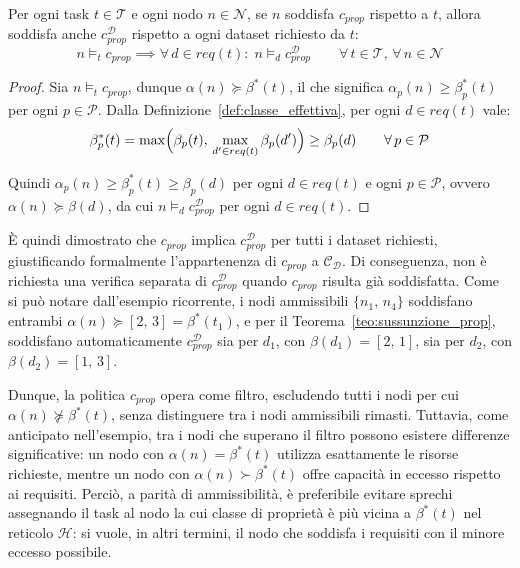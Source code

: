 \begin{theorem}
    \label{teo:sussunzione_prop}
    Per ogni task $t \in \mathcal{T}$ e ogni nodo $n \in \mathcal{N}$, se $n$ soddisfa $c_{prop}$ rispetto a $t$, allora soddisfa anche $c_{prop}^{\mathcal{D}}$ rispetto a ogni dataset richiesto da $t$:
    \begin{equation}
        n \models_t c_{prop}
        \implies
        \forall\, d \in req(t) :\; n \models_d c_{prop}^{\mathcal{D}}
        \qquad
        \forall\, t \in \mathcal{T},\, \forall\, n \in \mathcal{N}
    \end{equation}
    \begin{proof}
        Sia $n \models_t c_{prop}$, dunque $\alpha(n) \succeq \beta^*(t)$, il che significa $\alpha_p(n) \geq \beta^*_p(t)$ per ogni $p \in \mathcal{P}$. Dalla Definizione~\ref{def:classe_effettiva}, per ogni $d \in req(t)$ vale:
        \begin{equation}
            \beta^*_p(t)
            = \max\Bigl(\beta_p(t),\, \max_{d' \in req(t)} \beta_p(d')\Bigr)
            \geq \beta_p(d)
            \qquad
            \forall\, p \in \mathcal{P}
        \end{equation} 
        
        Quindi $\alpha_p(n) \geq \beta^*_p(t) \geq \beta_p(d)$ per ogni $d \in req(t)$ e ogni $p \in \mathcal{P}$, ovvero $\alpha(n) \succeq \beta(d)$, da cui $n \models_d c_{prop}^{\mathcal{D}}$ per ogni $d \in req(t)$.
    \end{proof}
\end{theorem}

È quindi dimostrato che $c_{prop}$ implica $c_{prop}^{\mathcal{D}}$ per tutti i dataset richiesti, giustificando formalmente l'appartenenza di $c_{prop}$ a $\mathcal{C_D}$. Di conseguenza, non è richiesta una verifica separata di $c_{prop}^{\mathcal{D}}$ quando $c_{prop}$ risulta già soddisfatta. Come si può notare dall'esempio ricorrente, i nodi ammissibili $\{n_1,\, n_4\}$ soddisfano entrambi $\alpha(n) \succeq [2,\, 3] = \beta^*(t_1)$, e per il Teorema~\ref{teo:sussunzione_prop}, soddisfano automaticamente $c_{prop}^{\mathcal{D}}$ sia per $d_1$, con $\beta(d_1) = [2,\, 1]$, sia per $d_2$, con $\beta(d_2) = [1,\, 3]$.

Dunque, la politica $c_{prop}$ opera come filtro, escludendo tutti i nodi per cui $\alpha(n) \not\succeq \beta^*(t)$, senza distinguere tra i nodi ammissibili rimasti. Tuttavia, come anticipato nell'esempio, tra i nodi che superano il filtro possono esistere differenze significative: un nodo con $\alpha(n) = \beta^*(t)$ utilizza esattamente le risorse richieste, mentre un nodo con $\alpha(n) \succ \beta^*(t)$ offre capacità in eccesso rispetto ai requisiti. Perciò, a parità di ammissibilità, è preferibile evitare sprechi assegnando il task al nodo la cui classe di proprietà è più vicina a $\beta^*(t)$ nel reticolo $\mathcal{H}$: si vuole, in altri termini, il nodo che soddisfa i requisiti con il minore eccesso possibile.

